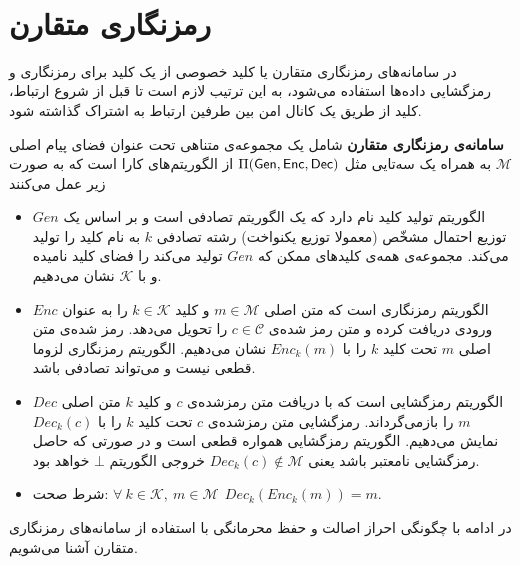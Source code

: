 

\

\section{رمزنگاری متقارن}
در سامانه‌های رمزنگاری متقارن یا کلید خصوصی از یک کلید برای رمزنگاری و رمزگشایی داده‌ها استفاده می‌شود، به این ترتیب لازم است تا قبل از شروع ارتباط، کلید از طریق یک کانال امن بین طرفین ارتباط به اشتراک گذاشته شود. 
\begin{definition}{\textbf{سامانه‌ی رمزنگاری متقارن}}
شامل یک مجموعه‌ی متناهی تحت عنوان فضای پیام اصلی 
$\mathcal{M}$
به همراه یک سه‌تایی مثل 
$\Pi(\mathsf{Gen},\mathsf{Enc},\mathsf{Dec})$
از الگوریتم‌های کارا است که به صورت زیر عمل می‌کنند
\cite{katz2014introduction}
\begin{itemize}
	\item
	$Gen$
	الگوریتم تولید کلید نام دارد که یک الگوریتم تصادفی است و بر اساس یک توزیع احتمال مشخّص (معمولا توزیع یکنواخت) رشته‌ تصادفی 
	$k$
	به نام کلید را تولید می‌کند. مجموعه‌ی همه‌ی کلید‌های ممکن که 
	$Gen$
	تولید می‌کند را فضای کلید نامیده و با 
	$\mathcal{K}$
	نشان می‌دهیم.
	\item
	$Enc$
	الگوریتم رمزنگاری است که متن اصلی 
	$m\in \mathcal{M}$
	و کلید 
	$k\in \mathcal{K}$
	را به عنوان ورودی دریافت کرده و متن رمز شده‌ی 
	$c\in \mathcal{C}$
	را تحویل می‌دهد. رمز شده‌ی متن اصلی 
	$m$
	تحت کلید 
	$k$
	را با 
	$Enc_{k}(m)$
	نشان می‌دهیم. الگوریتم رمزنگاری لزوما قطعی
	 نیست و می‌تواند تصادفی باشد.
	\item
	$Dec$
	الگوریتم رمزگشایی است که با دریافت متن رمزشده‌ی 
	$c$
	و کلید 
	$k$
	متن اصلی 
	$m$
	را بازمی‌گرداند. رمزگشایی متن رمزشده‌ی 
	$c$
	تحت کلید 
	$k$
	را با 
	$Dec_{k}(c)$
	نمایش می‌دهیم. الگوریتم رمزگشایی همواره قطعی است و در صورتی که حاصل رمزگشایی نامعتبر باشد یعنی 
	$Dec_{k}(c) \notin \mathcal{M}$
	خروجی الگوریتم
	$\bot$
	خواهد بود.

	
	\item
	شرط صحت: 
	$\forall \  k \in \mathcal{K}, \ m\in \mathcal{M}  \ \   Dec_{k}(Enc_{k}(m)) = m$.
\end{itemize}
\end{definition}
در ادامه با چگونگی احراز اصالت و حفظ محرمانگی با استفاده از سامانه‌های رمزنگاری متقارن آشنا می‌شویم.

